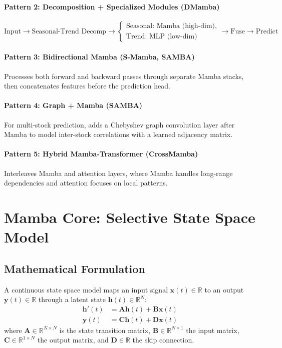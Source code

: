 \documentclass[11pt,a4paper]{article}
\newcommand{\R}{\mathbb{R}}
\begin{document}
\paragraph{Pattern 2: Decomposition + Specialized Modules (DMamba)}
\[
\text{Input} \to \text{Seasonal-Trend Decomp} \to
\begin{cases}
\text{Seasonal: Mamba (high-dim)}, \\
\text{Trend: MLP (low-dim)}
\end{cases} \to \text{Fuse} \to \text{Predict}
\]

\paragraph{Pattern 3: Bidirectional Mamba (S-Mamba, SAMBA)}
Processes both forward and backward passes through separate Mamba stacks,
then concatenates features before the prediction head.

\paragraph{Pattern 4: Graph + Mamba (SAMBA)}
For multi-stock prediction, adds a Chebyshev graph convolution layer after
Mamba to model inter-stock correlations with a learned adjacency matrix.

\paragraph{Pattern 5: Hybrid Mamba-Transformer (CrossMamba)}
Interleaves Mamba and attention layers, where Mamba handles long-range
dependencies and attention focuses on local patterns.

\section{Mamba Core: Selective State Space Model}

\subsection{Mathematical Formulation}

A continuous state space model maps an input signal $\mathbf{x}(t) \in \R$ to
an output $\mathbf{y}(t) \in \R$ through a latent state $\mathbf{h}(t) \in \R^N$:
\begin{align}
  \mathbf{h}'(t) &= \mathbf{A} \mathbf{h}(t) + \mathbf{B} \mathbf{x}(t) \\
  \mathbf{y}(t)  &= \mathbf{C} \mathbf{h}(t) + \mathbf{D} \mathbf{x}(t)
\end{align}
where $\mathbf{A} \in \R^{N \times N}$ is the state transition matrix,
$\mathbf{B} \in \R^{N \times 1}$ the input matrix, $\mathbf{C} \in \R^{1 \times N}$
the output matrix, and $\mathbf{D} \in \R$ the skip connection.
\end{document}
